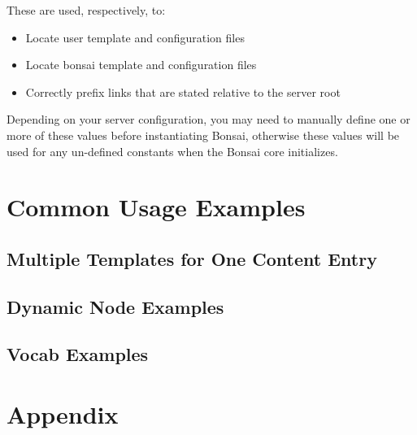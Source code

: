 \documentclass[]{book}
\begin{document}
These are used, respectively, to:

\begin{itemize}
	\item Locate user template and configuration files
	\item Locate bonsai template and configuration files
	\item Correctly prefix links that are stated relative to the server root
\end{itemize}

Depending on your server configuration, you may need to manually define one or more of these values before instantiating Bonsai, otherwise these values will be used for any un-defined constants when the Bonsai core initializes.

\chapter{Common Usage Examples}
\label{chapter:commonUsageExamples}

\section{Multiple Templates for One Content Entry}
\label{sec:multipleTemplates}

\section{Dynamic Node Examples}
\label{sec:dynamicNode}

\section{Vocab Examples}
\label{sec:vocabExamples}

\chapter*{Appendix}
\end{document}
